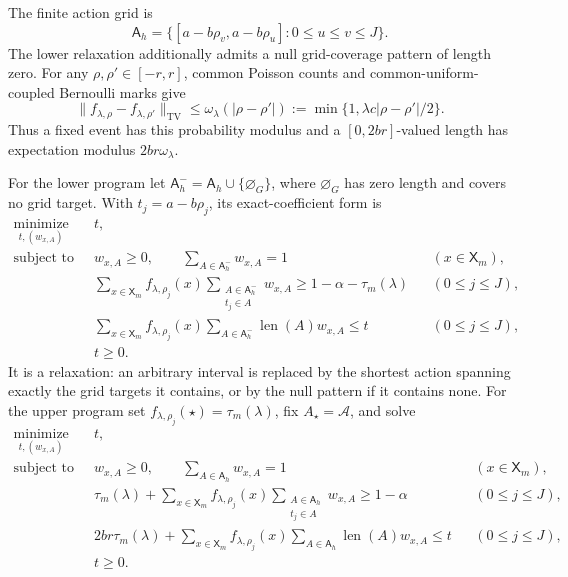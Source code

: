 The finite action grid is
\[
 \mathsf A_h=\{[a-b\rho_v,a-b\rho_u]:0\le u\le v\le J\}.
\]
The lower relaxation additionally admits a null grid-coverage pattern
of length zero.  For any \(\rho,\rho'\in[-r,r]\), common Poisson counts
and common-uniform-coupled Bernoulli marks give
\[
 \lVert f_{\lambda,\rho}-f_{\lambda,\rho'}\rVert_{\mathrm{TV}}
 \le\omega_\lambda(|\rho-\rho'|)
 :=\min\{1,\lambda c|\rho-\rho'|/2\}.
\]
Thus a fixed event has this probability modulus and a
\([0,2br]\)-valued length has expectation modulus
\(2br\omega_\lambda\).

For the lower program let
\(\mathsf A_h^-=\mathsf A_h\cup\{\varnothing_G\}\), where
\(\varnothing_G\) has zero length and covers no grid target.  With
\(t_j=a-b\rho_j\), its exact-coefficient form is
\[
 \begin{aligned}
 \operatorname*{minimize}_{t,(w_{x,A})}\quad &t,\\
 \text{subject to}\quad&
 w_{x,A}\ge0,\qquad \sum_{A\in\mathsf A_h^-}w_{x,A}=1
 &&(x\in\mathsf X_m),\\
 &\sum_{x\in\mathsf X_m} f_{\lambda,\rho_j}(x)
   \sum_{\substack{A\in\mathsf A_h^-\\t_j\in A}}w_{x,A}
   \ge1-\alpha-\tau_m(\lambda)
 &&(0\le j\le J),\\
 &\sum_{x\in\mathsf X_m} f_{\lambda,\rho_j}(x)
   \sum_{A\in\mathsf A_h^-}\operatorname{len}(A)w_{x,A}
   \le t
 &&(0\le j\le J),\\
 &t\ge0.
 \end{aligned}
 \tag{L}
\]
It is a relaxation: an arbitrary interval is replaced by the shortest
action spanning exactly the grid targets it contains, or by the null
pattern if it contains none.  For the upper program set
\(f_{\lambda,\rho_j}(\star)=\tau_m(\lambda)\), fix
\(A_\star=\mathcal A\), and solve
\[
 \begin{aligned}
 \operatorname*{minimize}_{t,(w_{x,A})}\quad &t,\\
 \text{subject to}\quad&
 w_{x,A}\ge0,\qquad \sum_{A\in\mathsf A_h}w_{x,A}=1
 &&(x\in\mathsf X_m),\\
 &\tau_m(\lambda)+\sum_{x\in\mathsf X_m} f_{\lambda,\rho_j}(x)
   \sum_{\substack{A\in\mathsf A_h\\t_j\in A}}w_{x,A}
   \ge1-\alpha
 &&(0\le j\le J),\\
 &2br\tau_m(\lambda)+\sum_{x\in\mathsf X_m} f_{\lambda,\rho_j}(x)
   \sum_{A\in\mathsf A_h}\operatorname{len}(A)w_{x,A}
   \le t
 &&(0\le j\le J),\\
 &t\ge0.
 \end{aligned}
 \tag{U}
\]

